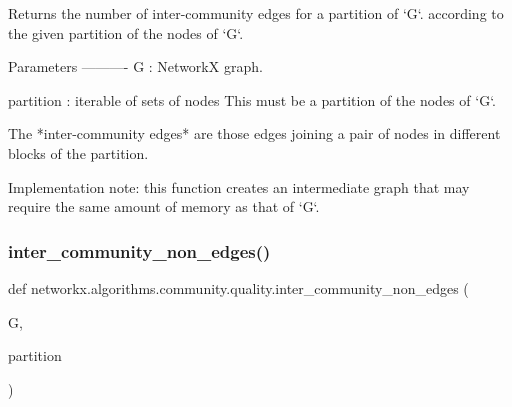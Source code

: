 \begin{DoxyVerb}Returns the number of inter-community edges for a partition of `G`.
according to the given
partition of the nodes of `G`.

Parameters
----------
G : NetworkX graph.

partition : iterable of sets of nodes
    This must be a partition of the nodes of `G`.

The *inter-community edges* are those edges joining a pair of nodes
in different blocks of the partition.

Implementation note: this function creates an intermediate graph
that may require the same amount of memory as that of `G`.\end{DoxyVerb}
 \mbox{\label{namespacenetworkx_1_1algorithms_1_1community_1_1quality_afe1d1f49e54b5efb38d9c0a63c41f55f}} 
\subsubsection{\texorpdfstring{inter\+\_\+community\+\_\+non\+\_\+edges()}{inter\_community\_non\_edges()}}
{\footnotesize\ttfamily def networkx.\+algorithms.\+community.\+quality.\+inter\+\_\+community\+\_\+non\+\_\+edges (\begin{DoxyParamCaption}\item[{}]{G,  }\item[{}]{partition }\end{DoxyParamCaption})}

